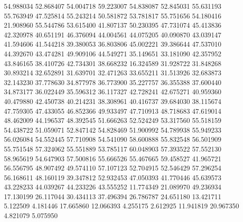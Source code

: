 54.988034
52.868407
54.004718
59.223007
54.838087
52.845031
55.631193
55.763949
47.525814
55.243214
50.581872
53.781817
55.751656
54.180416
21.908960
55.544786
53.615400
41.807137
50.230395
47.731074
45.413836
42.320978
40.651191
46.376094
44.004561
44.075205
40.090870
43.039147
41.594606
41.544218
39.380053
36.803806
45.002221
39.386644
47.537010
44.392670
43.474281
49.909106
44.549271
35.149651
33.181090
42.357952
43.846165
38.410726
42.734301
38.668232
16.324589
31.928722
31.848268
30.893214
32.652891
31.639701
32.471263
33.655211
31.513926
32.683873
32.143230
37.778630
34.877978
36.773900
35.227757
36.355388
37.600440
34.873177
36.022449
35.596312
36.117327
42.728241
42.675271
40.959360
40.479880
42.450738
40.214231
38.308961
40.416737
39.684030
38.115674
47.759305
47.433055
46.852366
49.933497
47.710913
48.718683
47.619014
48.462009
44.196537
48.392545
51.666263
52.524249
53.317560
55.518159
54.438722
51.059071
52.847142
54.828469
51.900992
54.789938
55.949233
56.026084
54.552445
57.710908
54.541090
58.600888
55.832548
56.501909
55.751548
57.324062
55.551889
53.785117
60.048903
57.393522
57.552130
58.965619
54.647903
57.500816
55.666526
55.467665
59.458527
41.965721
56.556795
48.907492
49.574110
57.107123
52.704915
52.546429
57.296254
56.168611
48.160119
39.347812
52.932453
47.050393
41.770446
45.639573
43.228233
44.039267
44.233226
43.555252
11.774349
21.089970
49.236934
17.130199
26.117044
30.434113
37.496394
26.786787
24.651180
13.421711
5.122509
4.181446
17.665860
12.066393
4.255175
2.612925
11.941819
20.967350
4.821079
5.075950
